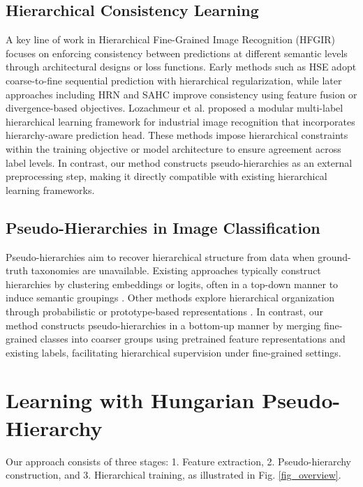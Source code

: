 \documentclass[conference,a4paper]{IEEEtran}
\begin{document}
\subsection{Hierarchical Consistency Learning}
A key line of work in Hierarchical Fine-Grained Image Recognition (HFGIR) focuses on enforcing consistency between predictions at different semantic levels through architectural designs or loss functions. Early methods such as HSE \cite{chen_fine-grained_2018} adopt coarse-to-fine sequential prediction with hierarchical regularization, while later approaches including HRN \cite{chen_label_2022} and SAHC \cite{weikmann_semantics-aware_2025} improve consistency using feature fusion or divergence-based objectives. Lozachmeur et al. \cite{lozachmeur_hierarchical_2025} proposed a modular multi-label hierarchical learning framework for industrial image recognition that incorporates hierarchy-aware prediction head. These methods impose hierarchical constraints within the training objective or model architecture to ensure agreement across label levels. In contrast, our method constructs pseudo-hierarchies as an external preprocessing step, making it directly compatible with existing hierarchical learning frameworks.

\subsection{Pseudo-Hierarchies in Image Classification}
Pseudo-hierarchies aim to recover hierarchical structure from data when ground-truth taxonomies are unavailable. Existing approaches typically construct hierarchies by clustering embeddings or logits, often in a top-down manner to induce semantic groupings \cite{zheng_online_2021, palumbo_logits_2025}. Other methods explore hierarchical organization through probabilistic or prototype-based representations \cite{wang_deep_2025, hsieh_pseudo-label_2019}. In contrast, our method constructs pseudo-hierarchies in a bottom-up manner by merging fine-grained classes into coarser groups using pretrained feature representations and existing labels, facilitating hierarchical supervision under fine-grained settings.

\section{Learning with Hungarian Pseudo-Hierarchy}
\label{sec_method}
Our approach consists of three stages: 1. Feature extraction, 2. Pseudo-hierarchy construction, and 3. Hierarchical training, as illustrated in Fig. \ref{fig_overview}.
\end{document}
